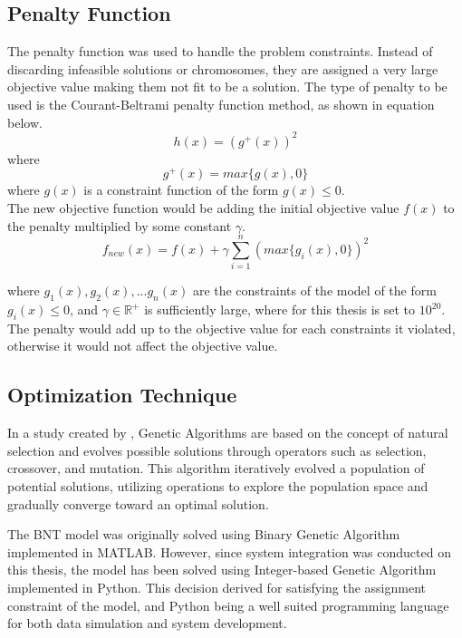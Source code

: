 \subsection{Penalty Function}
	The penalty function was used to handle the problem constraints. Instead of discarding infeasible solutions or chromosomes, they are assigned a very large objective value making them not fit to be a solution. The type of penalty to be used is the Courant-Beltrami penalty function method, as shown in equation below.
	\begin{equation*} 
		\label{p1}
		h(x)=(g^+(x))^2
	\end{equation*}
	where
	\begin{equation*} 
		\label{p2}
		g^+(x)=max\{g(x),0\}
	\end{equation*}
	where $g(x)$ is a constraint function of the form $g(x)\le0$. 
	\\
	
	The new objective function would be adding the initial objective value $f(x)$ to the penalty multiplied by some constant $\gamma$.
	\begin{equation*} 
		\label{p3}
		f_{new}(x)=f(x)+\gamma\sum_{i=1}^{n}(max\{g_i(x),0\})^2
	\end{equation*}
	
	where $g_1(x),g_2(x),...g_n(x)$ are the constraints of the model of the form $g_i(x)\le0$, and $\gamma\in\mathbb{R}^+$ is sufficiently large, where for this thesis is set to $10^{20}$. The penalty would add up to the objective value for each constraints it violated, otherwise it would not affect the objective value.	
	
\subsection{Optimization Technique}
	In a study created by \textcite{Mathew2012}, Genetic Algorithms are based on the concept of natural selection and evolves possible solutions through operators such as selection, crossover, and mutation. This algorithm iteratively evolved a population of potential solutions, utilizing operations to explore the population space and gradually converge toward an optimal solution.
	
	The BNT model was originally solved using Binary Genetic Algorithm implemented in MATLAB. However, since system integration was conducted on this thesis, the model has been solved using Integer-based Genetic Algorithm implemented in Python. This decision derived for satisfying the assignment constraint of the model, and Python being a well suited programming language for both data simulation and system development.
	
